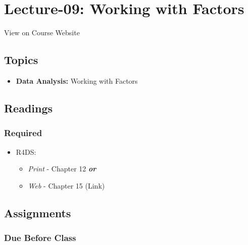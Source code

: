 \documentclass[]{book}
\providecommand{\tightlist}{%
  \setlength{\itemsep}{0pt}\setlength{\parskip}{0pt}}
\theoremstyle{definition}
\theoremstyle{definition}
\theoremstyle{definition}
\theoremstyle{remark}
\begin{document}
\hypertarget{lecture-09-working-with-factors}{%
\section*{Lecture-09: Working with
Factors}\label{lecture-09-working-with-factors}}

View on Course Website

\hypertarget{topics-9}{%
\subsection*{Topics}\label{topics-9}}

\begin{itemize}
\tightlist
\item
  \textbf{Data Analysis:} Working with Factors
\end{itemize}

\hypertarget{readings-10}{%
\subsection*{Readings}\label{readings-10}}

\hypertarget{required-10}{%
\subsubsection*{Required}\label{required-10}}

\begin{itemize}
\tightlist
\item
  R4DS:

  \begin{itemize}
  \tightlist
  \item
    \emph{Print} - Chapter 12 \textbf{\emph{or}}
  \item
    \emph{Web} - Chapter 15 (Link)
  \end{itemize}
\end{itemize}

\hypertarget{assignments-10}{%
\subsection*{Assignments}\label{assignments-10}}

\hypertarget{due-before-class-8}{%
\subsubsection*{Due Before Class}\label{due-before-class-8}}
\end{document}
